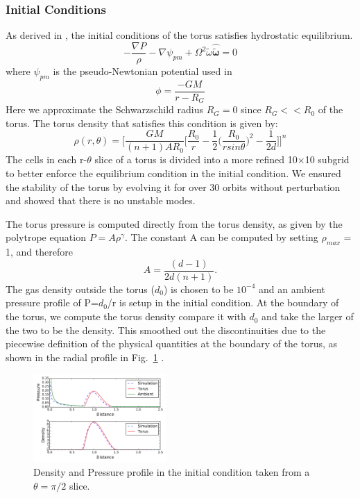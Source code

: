 \documentclass[iop,revtex4]{emulateapj}
\begin{document}
\subsubsection{Initial Conditions\label{sec:IC}}
\par As derived in \cite{Papaloizou:1984A}, the initial conditions of the torus satisfies hydrostatic equilibrium.
\begin{equation}
-\frac{\nabla P}{\rho}-\nabla \psi_{pm} +\Omega^2\tilde{\omega}\mathbf{\hat{\tilde{\omega}}}=0
\end{equation}
where $\psi_{pm}$ is the pseudo-Newtonian potential used in \cite{Blaes:1987A}
\begin{equation}
\phi = \frac{-GM}{r-R_G}
\end{equation}
 Here we approximate the Schwarzschild radius $R_G=0$ since $R_G <<R_0$ of the torus. The torus density that satisfies this condition is given by: 
\begin{equation}
\rho(r,\theta) = \Bigg[\frac{GM}{(n+1)AR_0}\Big[\frac{R_0}{r}-\frac{1}{2}\Bigg(\frac{R_0}{r sin\theta}\Bigg)^2-\frac{1}{2d}\Big]\Bigg]^n
\end{equation}
The cells in each r-$\theta$ slice of a torus is divided into a more refined 10$\times$10 subgrid to better enforce the equilibrium condition in the initial condition. We ensured the stability of the torus by evolving it for over 30 orbits without perturbation and showed that there is no unstable modes. 
\par The torus pressure is computed directly from the torus density, as given by the polytrope equation $P = A\rho^\gamma$.  The constant A can be computed by setting $\rho_{max}$ = 1, and therefore $$A =\frac{(d-1)}{2d(n+1)}.$$
The gas density outside the torus ($d_0$) is chosen to be $10^{-4}$ and an ambient pressure profile of P=$d_0$/r is setup in the initial condition. At the boundary of the torus, we compute the torus density compare it with $d_0$ and take the larger of the two to be the density. This smoothed out the discontinuities due to the piecewise definition of the physical quantities at the boundary of the torus, as shown in the radial profile in Fig.~\ref{d_p_profile} .
\begin{figure}
\includegraphics[width=0.45\textwidth,bb=0 0 30 30]{plots/profile.pdf}
\caption{Density and Pressure profile in the initial condition taken from a $\theta = \pi/2$ slice.}
\label{d_p_profile}
\end{figure}
\end{document}
